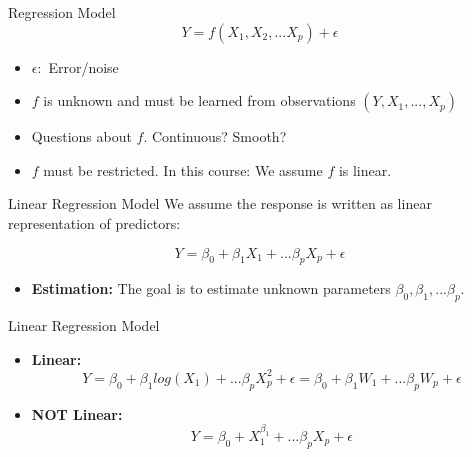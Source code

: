 \documentclass[
  ignorenonframetext,
]{beamer}
\providecommand{\tightlist}{%
  \setlength{\itemsep}{0pt}\setlength{\parskip}{0pt}}
\begin{document}
\begin{frame}{Regression Model}
\protect\hypertarget{regression-model}{}
\[Y= f(X_1, X_2, ...X_p) + \epsilon\]

\begin{itemize}
\tightlist
\item
  \(\epsilon:\) Error/noise
\item
  \(f\) is unknown and must be learned from observations
  \((Y, X_1, ..., X_p)\)
\item
  Questions about \(f\). Continuous? Smooth?
\item
  \(f\) must be restricted. In this course: We assume \(f\) is linear.
\end{itemize}
\end{frame}

\begin{frame}{Linear Regression Model}
\protect\hypertarget{linear-regression-model}{}
We assume the response is written as linear representation of
predictors:

\[Y = \beta_0 + \beta_1X_1+...\beta_pX_p + \epsilon\]

\begin{itemize}
\tightlist
\item
  \textbf{Estimation:} The goal is to estimate unknown parameters
  \(\beta_0, \beta_1, ...\beta_p\).
\end{itemize}
\end{frame}

\begin{frame}{Linear Regression Model}
\protect\hypertarget{linear-regression-model-1}{}
\begin{itemize}
\item
  \textbf{Linear:}
  \[Y = \beta_0 + \beta_1 log(X_1)+...\beta_pX_p^2 + \epsilon = \beta_0 + \beta_1 W_1+...\beta_pW_p + \epsilon \]
\item
  \textbf{NOT Linear:}
  \[Y = \beta_0 +  X_1^{\beta_1}+...\beta_pX_p + \epsilon\]
\end{itemize}
\end{frame}
\end{document}
